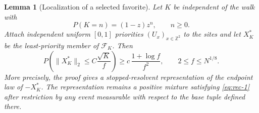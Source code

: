 \documentclass[12pt,reqno]{amsart}
\theoremstyle{plain}
\newtheorem{lemma}[theorem]{Lemma}
\theoremstyle{definition}
\theoremstyle{remark}
\numberwithin{equation}{section}
\begin{document}
\begin{lemma}[Localization of a selected favorite]\label{lem:plateau-bijection}
Let \(K\) be independent of the walk with
\[
       P(K=n)=(1-z)z^n,\qquad n\ge0.
\]
Attach independent uniform $[0,1]$ priorities \((U_x)_{x\in\mathbb Z^2}\) to
the sites and let \(X_K^*\) be the least-priority member of
\(\mathcal F_K\). Then
\begin{equation}
P\left(\lVert X_K^*\rVert_2\le C\frac{\sqrt K}{f}\right)
       \ge c\,\frac{1+\log f}{f^2},\qquad
       2\le f\le N^{1/8}.                                     \label{eq:rec-5}
\end{equation}
More precisely, the proof gives a stopped-resolvent representation of the
endpoint law of \(-X_K^*\). The representation remains a positive mixture
satisfying \eqref{eq:rec-1} after restriction by any event measurable with
respect to the base tuple defined there.
\end{lemma}
\end{document}
